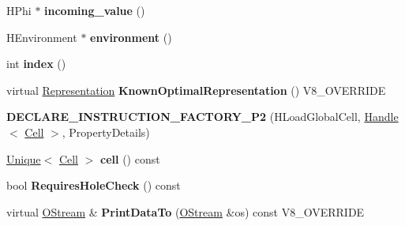 \begin{DoxyCompactItemize}
\item 
\hypertarget{classv8_1_1internal_1_1_v8___f_i_n_a_l_ae3029bb07f756ac0adc0c5841f43fc09}{}H\+Phi $\ast$ {\bfseries incoming\+\_\+value} ()\label{classv8_1_1internal_1_1_v8___f_i_n_a_l_ae3029bb07f756ac0adc0c5841f43fc09}

\item 
\hypertarget{classv8_1_1internal_1_1_v8___f_i_n_a_l_abb825df358f2ce0e1704234830c303aa}{}H\+Environment $\ast$ {\bfseries environment} ()\label{classv8_1_1internal_1_1_v8___f_i_n_a_l_abb825df358f2ce0e1704234830c303aa}

\item 
\hypertarget{classv8_1_1internal_1_1_v8___f_i_n_a_l_ae5c4241a042c07df1f4d7fa6fb262023}{}int {\bfseries index} ()\label{classv8_1_1internal_1_1_v8___f_i_n_a_l_ae5c4241a042c07df1f4d7fa6fb262023}

\item 
\hypertarget{classv8_1_1internal_1_1_v8___f_i_n_a_l_a03cf853403dec841cfc7e6277aaf3279}{}virtual \hyperlink{classv8_1_1internal_1_1_representation}{Representation} {\bfseries Known\+Optimal\+Representation} () V8\+\_\+\+O\+V\+E\+R\+R\+I\+D\+E\label{classv8_1_1internal_1_1_v8___f_i_n_a_l_a03cf853403dec841cfc7e6277aaf3279}

\item 
\hypertarget{classv8_1_1internal_1_1_v8___f_i_n_a_l_a65ce1c7fefce959cf3a47e15b73b88de}{}{\bfseries D\+E\+C\+L\+A\+R\+E\+\_\+\+I\+N\+S\+T\+R\+U\+C\+T\+I\+O\+N\+\_\+\+F\+A\+C\+T\+O\+R\+Y\+\_\+\+P2} (H\+Load\+Global\+Cell, \hyperlink{classv8_1_1internal_1_1_handle}{Handle}$<$ \hyperlink{classv8_1_1internal_1_1_cell}{Cell} $>$, Property\+Details)\label{classv8_1_1internal_1_1_v8___f_i_n_a_l_a65ce1c7fefce959cf3a47e15b73b88de}

\item 
\hypertarget{classv8_1_1internal_1_1_v8___f_i_n_a_l_a15444d90db74b674b470eac54db7bda7}{}\hyperlink{classv8_1_1internal_1_1_unique}{Unique}$<$ \hyperlink{classv8_1_1internal_1_1_cell}{Cell} $>$ {\bfseries cell} () const \label{classv8_1_1internal_1_1_v8___f_i_n_a_l_a15444d90db74b674b470eac54db7bda7}

\item 
\hypertarget{classv8_1_1internal_1_1_v8___f_i_n_a_l_a4baa3a2da8e6a98dcd29e67a269e36e3}{}bool {\bfseries Requires\+Hole\+Check} () const \label{classv8_1_1internal_1_1_v8___f_i_n_a_l_a4baa3a2da8e6a98dcd29e67a269e36e3}

\item 
\hypertarget{classv8_1_1internal_1_1_v8___f_i_n_a_l_ac450dad970b14246be761ccf5004924b}{}virtual \hyperlink{classv8_1_1internal_1_1_o_stream}{O\+Stream} \& {\bfseries Print\+Data\+To} (\hyperlink{classv8_1_1internal_1_1_o_stream}{O\+Stream} \&os) const V8\+\_\+\+O\+V\+E\+R\+R\+I\+D\+E\label{classv8_1_1internal_1_1_v8___f_i_n_a_l_ac450dad970b14246be761ccf5004924b}


\end{DoxyCompactItemize}

